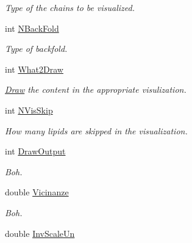 \begin{DoxyCompactItemize}
\begin{DoxyCompactList}\small\item\em \-Type of the chains to be visualized. \end{DoxyCompactList}\item 
\hypertarget{classElPoly_a051cdcf73b2b4af010122eed5c23c59d}{int \hyperlink{classElPoly_a051cdcf73b2b4af010122eed5c23c59d}{\-N\-Back\-Fold}}\label{classElPoly_a051cdcf73b2b4af010122eed5c23c59d}

\begin{DoxyCompactList}\small\item\em \-Type of backfold. \end{DoxyCompactList}\item 
\hypertarget{classElPoly_a247a6410f4f46763810a706af08a1c70}{int \hyperlink{classElPoly_a247a6410f4f46763810a706af08a1c70}{\-What2\-Draw}}\label{classElPoly_a247a6410f4f46763810a706af08a1c70}

\begin{DoxyCompactList}\small\item\em \hyperlink{classDraw}{\-Draw} the content in the appropriate visulization. \end{DoxyCompactList}\item 
\hypertarget{classElPoly_ae1c44ad3d54bfd33bcd7be4a5d1e9a8c}{int \hyperlink{classElPoly_ae1c44ad3d54bfd33bcd7be4a5d1e9a8c}{\-N\-Vis\-Skip}}\label{classElPoly_ae1c44ad3d54bfd33bcd7be4a5d1e9a8c}

\begin{DoxyCompactList}\small\item\em \-How many lipids are skipped in the visualization. \end{DoxyCompactList}\item 
int \hyperlink{classElPoly_af2d26fec9f7faeae1c79eb64268776c0}{\-Draw\-Output}
\begin{DoxyCompactList}\small\item\em \-Boh. \end{DoxyCompactList}\item 
double \hyperlink{classElPoly_ae8d6419041af331f07d9992abef3a867}{\-Vicinanze}
\begin{DoxyCompactList}\small\item\em \-Boh. \end{DoxyCompactList}\item 
\hypertarget{classElPoly_ae460da3c47449cbbd76b22e9c2501a69}{double \hyperlink{classElPoly_ae460da3c47449cbbd76b22e9c2501a69}{\-Inv\-Scale\-Un}}\label{classElPoly_ae460da3c47449cbbd76b22e9c2501a69}


\end{DoxyCompactItemize}
